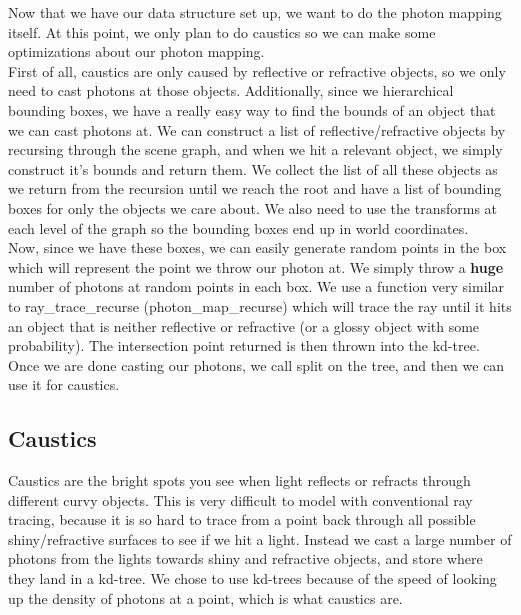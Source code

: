 \documentclass {article}
\begin{document}
Now that we have our data structure set up, we want to do the photon mapping
itself.  At this point, we only plan to do caustics so we can make some
optimizations about our photon mapping.\\

First of all, caustics are only caused by reflective or refractive objects, so
we only need to cast photons at those objects.  Additionally, since we
hierarchical bounding boxes, we have a really easy way to find the bounds of an
object that we can cast photons at.  We can construct a list of
reflective/refractive objects by recursing through the scene graph, and when we
hit a relevant object, we simply construct it's bounds and return them.  We
collect the list of all these objects as we return from the recursion until we
reach the root and have a list of bounding boxes for only the objects we care
about.  We also need to use the transforms at each level of the graph so the
bounding boxes end up in world coordinates.\\

Now, since we have these boxes, we can easily generate random points in the box
which will represent the point we throw our photon at.  We simply throw a
\textbf{huge} number of photons at random points in each box.  We use a function
very similar to ray\_trace\_recurse (photon\_map\_recurse) which will trace the
ray until it hits an object that is neither reflective or refractive (or a
glossy object with some probability).  The intersection point returned is then
thrown into the kd-tree.\\

Once we are done casting our photons, we call split on the tree, and then we can
use it for caustics.\\

\subsection{Caustics}
Caustics are the bright spots you see when light reflects or refracts through
different curvy objects.  This is very difficult to model with conventional ray
tracing, because it is so hard to trace from a point back through all possible
shiny/refractive surfaces to see if we hit a light.  Instead we cast a large
number of photons from the lights towards shiny and refractive objects, and
store where they land in a kd-tree.  We chose to use kd-trees because of the
speed of looking up the density of photons at a point, which is what caustics
are.\\
\end{document}

